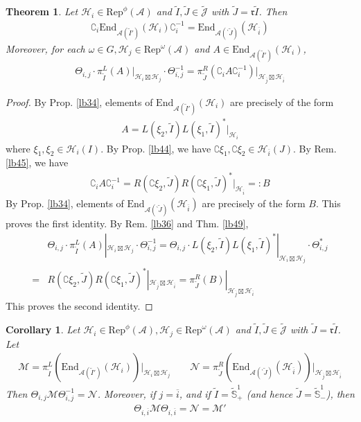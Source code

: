 \documentclass[11pt,b5paper,notitlepage]{article}
\theoremstyle{definition}
\theoremstyle{plain}
\newtheorem{thm}[df]{Theorem}
\newtheorem{co}[df]{Corollary}
\newcommand{\wtd}{\widetilde}
\newcommand{\ovl}{\overline}
\newcommand{\End}{\mathrm{End}} %
\newcommand{\Rep}{\mathrm{Rep}}
\newcommand{\Jtd}{\widetilde{\mathcal J}}
\newcommand{\Co}{\complement}
\newcommand{\bpr}{{}^\backprime}
\newcommand{\rk}{\mathfrak r}
\newcommand{\MA}{\mathcal A}
\newcommand{\MH}{\mathcal H}
\newcommand{\MM}{\mathcal M}
\newcommand{\MN}{\mathcal N}
\newcommand{\Std}{\widetilde {\mathbb S}^1}
\numberwithin{equation}{section}
\begin{document}

\begin{thm}\label{lb107}
Let $\MH_i\in\Rep^\phi(\MA)$ and $\wtd I,\wtd J\in\Jtd$ with $\wtd J=\rk\wtd I$. Then
\begin{align*}
\Co_i \End_{\MA(\wtd I')}(\MH_i)\Co_i^{-1}=\End_{\MA(\bpr\wtd J)}(\MH_{\ovl i})
\end{align*}
Moreover, for each $\omega\in G,\MH_j\in\Rep^\omega(\MA)$ and $A\in\End_{\MA(\wtd I')}(\MH_i)$, 
\begin{align*}
\Theta_{i,j}\cdot\pi^L_{\wtd I}(A)\big|_{\MH_i\boxtimes\MH_j}\cdot\Theta_{i,j}^{-1}=\pi^R_{\wtd J}(\Co_i A\Co_i^{-1})\big|_{\MH_{\ovl j}\boxtimes\MH_{\ovl i}}
\end{align*}
\end{thm}




\begin{proof}
By Prop. \ref{lb34}, elements of $\End_{\MA(\wtd I')}(\MH_i)$ are precisely of the form
\begin{align*}
A=L(\xi_2,\wtd I)L(\xi_1,\wtd I)^*|_{\MH_i}
\end{align*}
where $\xi_1,\xi_2\in\MH_i(I)$. By Prop. \ref{lb44}, we have $\Co\xi_1,\Co\xi_2\in\MH_{\ovl i}(J)$. By Rem. \ref{lb45}, we have
\begin{align*}
\Co_iA\Co_i^{-1}=R(\Co\xi_2,\wtd J)R(\Co\xi_1,\wtd J)^*|_{\MH_{\ovl i}}=:B
\end{align*}
By Prop. \ref{lb34}, elements of $\End_{\MA(\bpr\wtd J)}(\MH_{\ovl i})$ are precisely of the form $B$. This proves the first identity. By Rem. \ref{lb36} and Thm. \ref{lb49},
\begin{align*}
&\Theta_{i,j}\cdot\pi^L_{\wtd I}(A)|_{\MH_i\boxtimes\MH_j}\cdot\Theta_{i,j}^{-1}=\Theta_{i,j}\cdot L(\xi_2,\wtd I)L(\xi_1,\wtd I)^*|_{\MH_i\boxtimes\MH_j}\cdot\Theta_{i,j}^*\\
=&R(\Co\xi_2,\wtd J)R(\Co\xi_1,\wtd J)^*|_{\MH_{\ovl j}\boxtimes\MH_{\ovl i}}=\pi^R_{\wtd J}(B)|_{\MH_{\ovl j}\boxtimes\MH_{\ovl i}}
\end{align*}
This proves the second identity.
\end{proof}






\begin{co}\label{lb87}
Let $\MH_i\in\Rep^\phi(\MA),\MH_j\in\Rep^\omega(\MA)$ and $\wtd I,\wtd J\in\Jtd$ with $\wtd J=\rk\wtd I$. Let
\begin{align*}
\MM=\pi^L_{\wtd I}(\End_{\MA(\wtd I')}(\MH_i))\big|_{\MH_i\boxtimes\MH_j}\qquad \MN=\pi^R_{\wtd J}(\End_{\MA(\bpr\wtd J)}(\MH_{\ovl i}))\big|_{\MH_{\ovl j}\boxtimes\MH_{\ovl i}}
\end{align*}
Then $\Theta_{i,j}\MM\Theta_{i,j}^{-1}=\MN$. Moreover, if $j=\ovl i$, and if $\wtd I=\Std_+$ (and hence $\wtd J=\Std_-$), then
\begin{align*}
\Theta_{i,\ovl i}\MM\Theta_{i,\ovl i}=\MN=\MM'
\end{align*}
\end{co}
\end{document}
